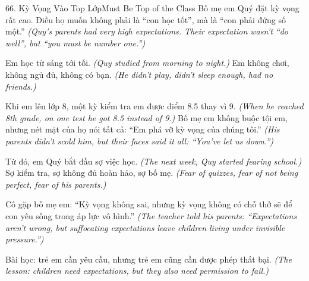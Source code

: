 \begin{truyen}{66. Kỳ Vọng Vào Top Lớp}{Must Be Top of the Class}
Bố mẹ em Quý đặt kỳ vọng rất cao. Điều họ muốn không phải là ``con học tốt'', mà là ``con phải đứng số một.''
\textit{(Quy's parents had very high expectations. Their expectation wasn't ``do well'', but ``you must be number one.'')}

Em học từ sáng tới tối.
\textit{(Quy studied from morning to night.)}
Em không chơi, không ngủ đủ, không có bạn.
\textit{(He didn't play, didn't sleep enough, had no friends.)}

Khi em lên lớp 8, một kỳ kiểm tra em được điểm 8.5 thay vì 9.
\textit{(When he reached 8th grade, on one test he got 8.5 instead of 9.)}
Bố mẹ em không buộc tội em, nhưng nét mặt của họ nói tất cả: ``Em phá vỡ kỳ vọng của chúng tôi.''
\textit{(His parents didn't scold him, but their faces said it all: ``You've let us down.'')}

Từ đó, em Quý bắt đầu sợ việc học.
\textit{(The next week, Quy started fearing school.)}
Sợ kiểm tra, sợ không đủ hoàn hảo, sợ bố mẹ.
\textit{(Fear of quizzes, fear of not being perfect, fear of his parents.)}

Cô gặp bố mẹ em: ``Kỳ vọng không sai, nhưng kỳ vọng không có chỗ thở sẽ để con yêu sống trong áp lực vô hình.''
\textit{(The teacher told his parents: ``Expectations aren't wrong, but suffocating expectations leave children living under invisible pressure.'')}

Bài học: trẻ em cần yêu cầu, nhưng trẻ em cũng cần được phép thất bại.
\textit{(The lesson: children need expectations, but they also need permission to fail.)}
\end{truyen}

